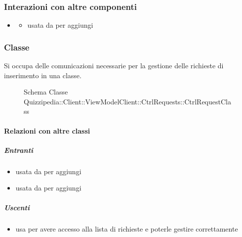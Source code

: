 \subsubsection{Interazioni con altre componenti}
\begin{itemize}
\item {}
\begin{itemize}
\item usata da  per aggiungi
\end{itemize}
\end{itemize}
\subsubsection{Classe }
Si occupa delle comunicazioni necessarie per la gestione delle richieste di inserimento in una classe.
\begin{figure}[H]
\centering
\noindent{}
\caption[Schema Classe CtrlRequestClass]{Schema Classe Quizzipedia::Client::ViewModelClient::CtrlRequests::CtrlRequestClass}
\end{figure}
\paragraph{Relazioni con altre classi}
\subparagraph{Entranti}
\begin{itemize}
\item usata da  per aggiungi
\item usata da  per aggiungi
\end{itemize}
\subparagraph{Uscenti}
\begin{itemize}
\item usa  per avere accesso alla lista di richieste e poterle gestire correttamente
\end{itemize}
